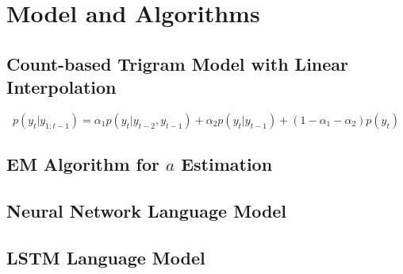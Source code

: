 \documentclass[11pt]{article}
\begin{document}



\section{Model and Algorithms}

\subsection{Count-based Trigram Model with Linear Interpolation}

$$p(y_t | y_{1:t-1}) =  \alpha_1 p(y_t | y_{t-2}, y_{t-1}) + \alpha_2 p(y_t | y_{t-1}) + (1 - \alpha_1 - \alpha_2) p(y_t) $$

\subsection{EM Algorithm for $a$ Estimation}

\subsection{Neural Network Language Model}

\subsection{LSTM Language Model}



\end{document}
